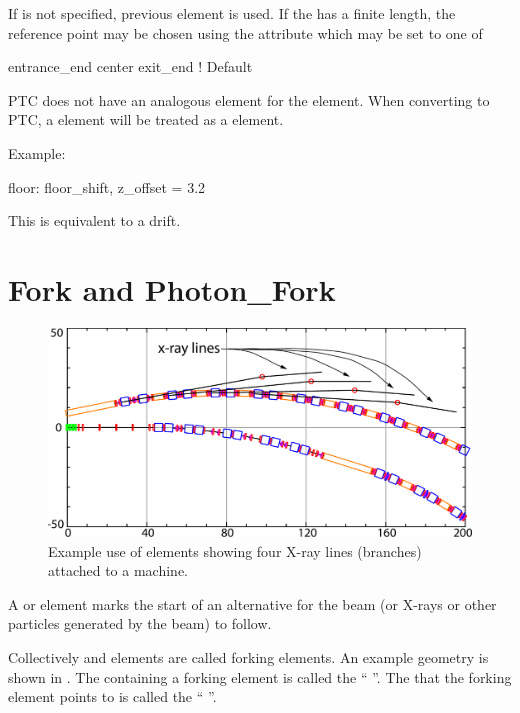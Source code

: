 If  is not specified, previous element is used. If the
 has a finite length, the reference point may be chosen
using the  attribute which may be set to one of
\begin{example}
  entrance_end
  center
  exit_end         ! Default
\end{example}

PTC does not have an analogous element for the 
element. When converting to PTC, a  element will be treated
as a  element.

Example: 
\begin{example}
  floor: floor_shift, z_offset = 3.2
\end{example}
This is equivalent to a drift.

\section{Fork and Photon_Fork}
\label{s:fork}

\begin{figure}[tb]
  \centering
  \includegraphics[width=5in]{x-fork.pdf}
  \caption[Example with photon_fork elements.]
  {
Example use of  elements showing four X-ray lines (branches)
attached to a machine.
  }
  \label{f:x.fork}
\end{figure}

A  or  element marks the start of an
alternative  for the beam (or X-rays or other
particles generated by the beam) to follow. 

Collectively  and  elements are called
forking elements. An example geometry is shown in .  The
 containing a forking element is called the ``
''. The  that the forking element points to is
called the `` ''. 

